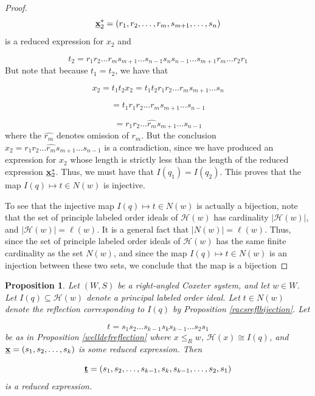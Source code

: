 \documentclass{amsart}
\theoremstyle{plain} %
\newtheorem{prop}[thm]{Proposition}
\theoremstyle{definition}
\def\weakr{\leq_{R}}
\def\H#1{\mathcal{H}(#1)}
\begin{document}
\begin{proof}
    $$ \textbf{\underline{x}}_{2}^{\ast} = (r_{1}, r_{2}, \dots , r_{m}, s_{m+1}, \dots, s_{n})$$
    is a reduced expression for $ x_{2}$ and 

    $$ t_{2} =  r_{1}r_{2} \dots  r_{m}s_{m+1} \dots s_{n-1}s_{n}s_{n-1} \dots s_{m+1}r_{m} \dots r_{2}r_{1}$$
    But note that because $ t_{1} = t_{2}$, we have that

    $$ x_{2} = t_{1}t_{2}x_{2} = t_{1}t_{2} r_{1}r_{2} \dots r_{m}s_{m+1} \dots s_{n}$$

    $$ =  t_{1} r_{1}r_{2} \dots r_{m}s_{m+1} \dots s_{n-1}$$

    $$ = r_{1}r_{2} \dots \widehat{r_{m}}s_{m+1} \dots s_{n-1}$$
    where the $\widehat{r_{m}}$ denotes omission of $ r_{m}$. But the conclusion $ x_{2} = r_{1}r_{2} \dots \widehat{r_{m}}s_{m+1} \dots s_{n-1}$ is a contradiction, since we have produced an expression for $ x_{2}$ whose length is strictly less than the length of the reduced expression $  \textbf{\underline{x}}_{2}^{\ast}$. Thus, we must have that $ I(q_{1}) = I(q_{2})$. This proves that the map $ I(q) \longmapsto t\in N(w)$ is injective. 

    To see that the injective map $ I(q) \longmapsto t\in N(w)$ is actually a bijection, note that the set of principle labeled order ideals of $ \H{w}$ has cardinality $ |\H{w}|$, and $ |\H{w}| = \ell(w)$. It is a general fact that $ |N(w)| = \ell(w)$. Thus, since the set of principle labeled order ideals of $ \H{w}$ has the same finite cardinality as the set $ N(w)$, and since the map $ I(q) \longmapsto t\in N(w)$ is an injection between these two sets, we conclude that the map is a bijection



    
\end{proof}

\begin{prop} \label{reflwordreduced}
    Let $ (W,S)$ be a right-angled Coxeter system, and let $ w\in W$. Let $ I(q) \subseteq \H{w}$ denote a principal labeled order ideal. Let $ t\in N(w)$ denote the reflection corresponding to $ I(q)$ by Proposition \ref{racsreflbijection}. Let 

    $$ t = s_{1}s_{2} \dots s_{k-1}s_{k}s_{k-1} \dots s_{2}s_{1}$$
    be as in Proposition \ref{welldefreflection} where $ x\weakr w$, $ \H{x} \cong I(q)$, and $ \textbf{\underline{x}} = (s_{1},s_{2}, \dots , s_{k})$ is some reduced expression. Then

    $$ \textbf{\underline{t}} = (s_{1},s_{2}, \dots, s_{k-1},s_{k},s_{k-1}, \dots ,s_{2},s_{1})$$
    is a reduced expression.
\end{prop}
\end{document}
